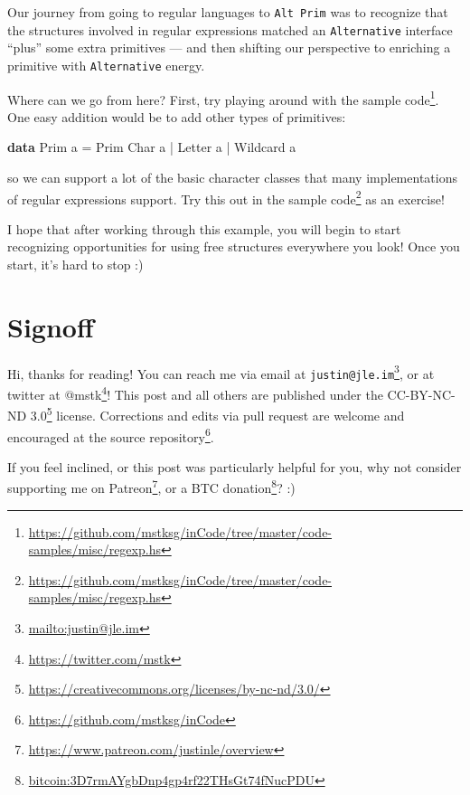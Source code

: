 \documentclass[]{article}
\newenvironment{Shaded}{}{}
\newcommand{\DataTypeTok}[1]{\textcolor[rgb]{0.56,0.13,0.00}{#1}}
\newcommand{\FunctionTok}[1]{\textcolor[rgb]{0.02,0.16,0.49}{#1}}
\newcommand{\KeywordTok}[1]{\textcolor[rgb]{0.00,0.44,0.13}{\textbf{#1}}}
\newcommand{\NormalTok}[1]{#1}
\renewcommand{\href}[2]{#2\footnote{\url{#1}}}
\begin{document}
Our journey from going to regular languages to \texttt{Alt\ Prim} was to
recognize that the structures involved in regular expressions matched an
\texttt{Alternative} interface ``plus'' some extra primitives --- and then
shifting our perspective to enriching a primitive with \texttt{Alternative}
energy.

Where can we go from here? First, try playing around with the
\href{https://github.com/mstksg/inCode/tree/master/code-samples/misc/regexp.hs}{sample
code}. One easy addition would be to add other types of primitives:

\begin{Shaded}
\begin{Highlighting}[]
\KeywordTok{data} \DataTypeTok{Prim}\NormalTok{ a }\FunctionTok{=} \DataTypeTok{Prim} \DataTypeTok{Char}\NormalTok{ a}
            \FunctionTok{|} \DataTypeTok{Letter}\NormalTok{ a}
            \FunctionTok{|} \DataTypeTok{Wildcard}\NormalTok{ a}
\end{Highlighting}
\end{Shaded}

so we can support a lot of the basic character classes that many implementations
of regular expressions support. Try this out in the
\href{https://github.com/mstksg/inCode/tree/master/code-samples/misc/regexp.hs}{sample
code} as an exercise!

I hope that after working through this example, you will begin to start
recognizing opportunities for using free structures everywhere you look! Once
you start, it's hard to stop :)

\hypertarget{signoff}{%
\section{Signoff}\label{signoff}}

Hi, thanks for reading! You can reach me via email at
\href{mailto:justin@jle.im}{\nolinkurl{justin@jle.im}}, or at twitter at
\href{https://twitter.com/mstk}{@mstk}! This post and all others are published
under the \href{https://creativecommons.org/licenses/by-nc-nd/3.0/}{CC-BY-NC-ND
3.0} license. Corrections and edits via pull request are welcome and encouraged
at \href{https://github.com/mstksg/inCode}{the source repository}.

If you feel inclined, or this post was particularly helpful for you, why not
consider \href{https://www.patreon.com/justinle/overview}{supporting me on
Patreon}, or a \href{bitcoin:3D7rmAYgbDnp4gp4rf22THsGt74fNucPDU}{BTC donation}?
:)
\end{document}
